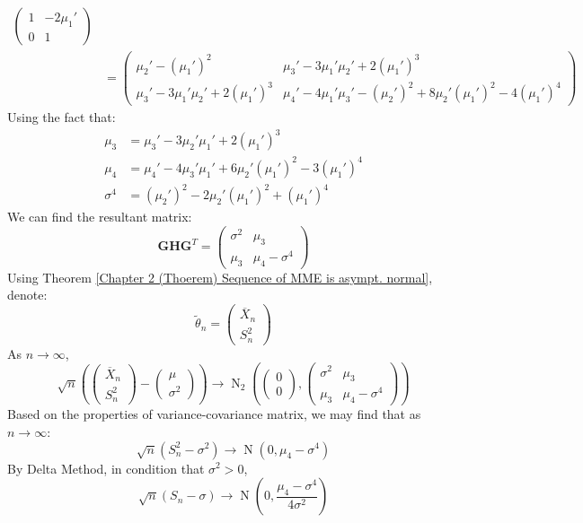\documentclass{huhtakm-template-book-v2}
\DeclareMathOperator{\N}{N}
\begin{document}
\begin{eg}
\begin{align*}
\begin{pmatrix}
			1 & -2\mu_{1}'\\
			0 & 1
		\end{pmatrix}\\
		&=\begin{pmatrix}
			\mu_{2}'-(\mu_{1}')^{2} & \mu_{3}'-3\mu_{1}'\mu_{2}'+2(\mu_{1}')^{3}\\
			\mu_{3}'-3\mu_{1}'\mu_{2}'+2(\mu_{1}')^{3} & \mu_{4}'-4\mu_{1}'\mu_{3}'-(\mu_{2}')^{2}+8\mu_{2}'(\mu_{1}')^{2}-4(\mu_{1}')^{4}
		\end{pmatrix}
	\end{align*}
	Using the fact that:
	\begin{align*}
		\mu_{3}&=\mu_{3}'-3\mu_{2}'\mu_{1}'+2(\mu_{1}')^{3}\\ \mu_{4}&=\mu_{4}'-4\mu_{3}'\mu_{1}'+6\mu_{2}'(\mu_{1}')^{2}-3(\mu_{1}')^{4}\\
		\sigma^{4}&=(\mu_{2}')^{2}-2\mu_{2}'(\mu_{1}')^{2}+(\mu_{1}')^{4}
	\end{align*}
	We can find the resultant matrix:
	\begin{equation*}
		\mathbf{GHG}^{T}=\begin{pmatrix}
			\sigma^{2} & \mu_{3}\\
			\mu_{3} & \mu_{4}-\sigma^{4}
		\end{pmatrix}
	\end{equation*}
	Using Theorem \ref{Chapter 2 (Thoerem) Sequence of MME is asympt. normal}, denote:
	\begin{equation*}
		\widetilde{\theta}_{n}=\begin{pmatrix}
			\overline{X}_{n}\\ S_{n}^{2}
		\end{pmatrix}
	\end{equation*}
	As $n\to\infty$,
	\begin{equation*}
		\sqrt{n}\left(\begin{pmatrix}
			\overline{X}_{n}\\ S_{n}^{2}
		\end{pmatrix}-\begin{pmatrix}
			\mu\\ \sigma^{2}
		\end{pmatrix}\right)\to\N_{2}\left(\begin{pmatrix}
			0\\ 0
		\end{pmatrix},\begin{pmatrix}
			\sigma^{2} & \mu_{3}\\
			\mu_{3} & \mu_{4}-\sigma^{4}
		\end{pmatrix}\right)
	\end{equation*}
	Based on the properties of variance-covariance matrix, we may find that as $n\to\infty$:
	\begin{equation*}
		\sqrt{n}(S_{n}^{2}-\sigma^{2})\to\N(0,\mu_{4}-\sigma^{4})
	\end{equation*}
	By Delta Method, in condition that $\sigma^{2}>0$,
	\begin{equation*}
		\sqrt{n}(S_{n}-\sigma)\to\N\left(0,\frac{\mu_{4}-\sigma^{4}}{4\sigma^{2}}\right)
	\end{equation*}
\end{eg}
\end{document}
